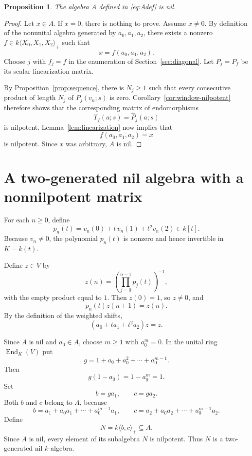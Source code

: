 \documentclass[11pt]{article}
\newtheorem{proposition}[theorem]{Proposition}
\newcommand{\End}{\operatorname{End}}
\newcommand{\Free}{k\langle X_0,X_1,X_2\rangle_+}
\begin{document}
\begin{proposition}\label{prop:A-nil}
The algebra $A$ defined in \eqref{eq:Adef} is nil.
\end{proposition}

\begin{proof}
Let $x\in A$.  If $x=0$, there is nothing to prove.  Assume $x\ne0$.  By definition of the nonunital algebra generated by $a_0,a_1,a_2$, there exists a nonzero $f\in\Free$ such that
\[
x=f(a_0,a_1,a_2).
\]
Choose $j$ with $f_j=f$ in the enumeration of Section~\ref{sec:diagonal}.  Let $P_j=P_f$ be its scalar linearization matrix.

By Proposition~\ref{prop:sequence}, there is $N_j\ge1$ such that every consecutive product of length $N_j$ of $P_j(v_n;s)$ is zero.  Corollary~\ref{cor:window-nilpotent} therefore shows that the corresponding matrix of endomorphisms
\[
T_f(a;s)=\widehat P_j(a;s)
\]
is nilpotent.  Lemma~\ref{lem:linearization} now implies that
\[
f(a_0,a_1,a_2)=x
\]
is nilpotent.  Since $x$ was arbitrary, $A$ is nil.
\end{proof}

\section{A two-generated nil algebra with a nonnilpotent matrix}\label{sec:matrix}

For each $n\ge0$, define
\begin{equation}\label{eq:pn}
p_n(t)=v_n(0)+t\,v_n(1)+t^2v_n(2)\in k[t].
\end{equation}
Because $v_n\ne0$, the polynomial $p_n(t)$ is nonzero and hence invertible in $K=k(t)$.

Define $z\in V$ by
\begin{equation}\label{eq:z}
z(n)=\left(\prod_{j=0}^{n-1}p_j(t)\right)^{-1},
\end{equation}
with the empty product equal to $1$.  Then $z(0)=1$, so $z\ne0$, and
\[
p_n(t)z(n+1)=z(n).
\]
By the definition of the weighted shifts,
\begin{equation}\label{eq:fixed}
(a_0+t a_1+t^2a_2)z=z.
\end{equation}

Since $A$ is nil and $a_0\in A$, choose $m\ge1$ with $a_0^m=0$.  In the unital ring $\End_K(V)$ put
\[
g=1+a_0+a_0^2+\cdots+a_0^{m-1}.
\]
Then
\begin{equation}\label{eq:geom}
g(1-a_0)=1-a_0^m=1.
\end{equation}
Set
\begin{equation}\label{eq:bc}
b=ga_1,
\qquad
c=ga_2.
\end{equation}
Both $b$ and $c$ belong to $A$, because
\[
b=a_1+a_0a_1+\cdots+a_0^{m-1}a_1,
\qquad
c=a_2+a_0a_2+\cdots+a_0^{m-1}a_2.
\]
Define
\[
N=k\langle b,c\rangle_+\subseteq A.
\]
Since $A$ is nil, every element of its subalgebra $N$ is nilpotent.  Thus $N$ is a two-generated nil $k$-algebra.
\end{document}
